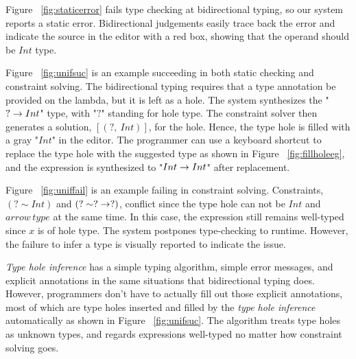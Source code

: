 \par Figure ~\ref{fig:staticerror} fails type checking at bidirectional typing, so our system reports a static error. Bidirectional judgements easily trace back the error and indicate the source in the editor with a red box, showing that the operand should be $Int$ type. \par 
Figure ~\ref{fig:unifsuc} is an example succeeding in both static checking and constraint solving.  The bidirectional typing requires that a type annotation be provided on the lambda, but it is left as a hole. The system synthesizes the "$? \rightarrow Int$" type, with "$?$" standing for hole type. The constraint solver then generates a solution, $[(?,~ Int)]$, for the hole. Hence, the type hole is filled with a gray "$Int$" in the editor. The programmer can use a keyboard shortcut to replace the type hole with the suggested type as shown in Figure ~\ref{fig:fillholeeg}, and the expression is synthesized to "$Int \rightarrow Int$" after replacement. \par

Figure ~\ref{fig:uniffail} is an example failing in constraint solving. Constraints, $(? \sim Int)$ and $(? \sim ? \rightarrow ?)$, conflict since the type hole can not be $Int$ and $arrow \, type$ at the same time. In this case, the expression still remains well-typed since $x$ is of hole type. The system postpones type-checking to runtime. However, the failure to infer a type is visually reported to indicate the issue.

\emph{Type hole inference} has a simple typing algorithm, simple error messages, and explicit annotations in the same situations that bidirectional typing does. However, programmers don't have to actually fill out those explicit annotations, most of which are type holes inserted and filled by the \emph{type hole inference} automatically as shown in Figure ~\ref{fig:unifsuc}. The algorithm treats type holes as unknown types, and regards expressions well-typed no matter how constraint solving goes. 


